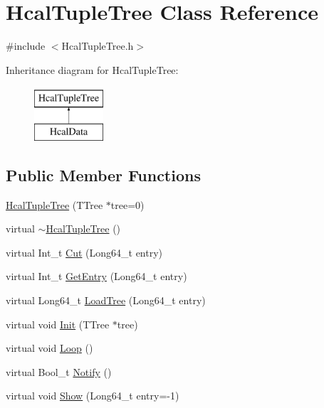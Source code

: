 \hypertarget{class_hcal_tuple_tree}{}\section{Hcal\+Tuple\+Tree Class Reference}
\label{class_hcal_tuple_tree}


{\ttfamily \#include $<$Hcal\+Tuple\+Tree.\+h$>$}

Inheritance diagram for Hcal\+Tuple\+Tree\+:\begin{figure}[H]
\begin{center}
\leavevmode
\includegraphics[height=2.000000cm]{class_hcal_tuple_tree}
\end{center}
\end{figure}
\subsection*{Public Member Functions}
\begin{DoxyCompactItemize}
\item 
\hyperlink{class_hcal_tuple_tree_a93a2b9686fd32bc3145c0653c2255203}{Hcal\+Tuple\+Tree} (T\+Tree $\ast$tree=0)
\item 
virtual \hyperlink{class_hcal_tuple_tree_a2bba2f967fd63217177ec8275f4378d1}{$\sim$\+Hcal\+Tuple\+Tree} ()
\item 
virtual Int\+\_\+t \hyperlink{class_hcal_tuple_tree_a3c6f115f9de0929d577fd3fee90ab347}{Cut} (Long64\+\_\+t entry)
\item 
virtual Int\+\_\+t \hyperlink{class_hcal_tuple_tree_a61ac2553042cf88a12bd462a7814c18d}{Get\+Entry} (Long64\+\_\+t entry)
\item 
virtual Long64\+\_\+t \hyperlink{class_hcal_tuple_tree_ae02bb52e1602961c2d50eb112a539ab2}{Load\+Tree} (Long64\+\_\+t entry)
\item 
virtual void \hyperlink{class_hcal_tuple_tree_ad624a0b1c545a1aade5b6c1af6f680f9}{Init} (T\+Tree $\ast$tree)
\item 
virtual void \hyperlink{class_hcal_tuple_tree_a2786184220161c1733fe48f6b729ad03}{Loop} ()
\item 
virtual Bool\+\_\+t \hyperlink{class_hcal_tuple_tree_a96cea8c5f1ff0a479fa1f5f46267fd1d}{Notify} ()
\item 
virtual void \hyperlink{class_hcal_tuple_tree_ab48299f2334cd356df44d4d695e4f6c6}{Show} (Long64\+\_\+t entry=-\/1)
\end{DoxyCompactItemize}
